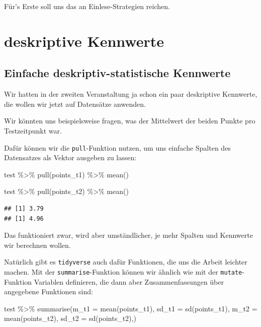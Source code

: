 \documentclass[
]{book}
\newenvironment{Shaded}{\begin{snugshade}}{\end{snugshade}}
\newcommand{\AttributeTok}[1]{\textcolor[rgb]{0.77,0.63,0.00}{#1}}
\newcommand{\FunctionTok}[1]{\textcolor[rgb]{0.00,0.00,0.00}{#1}}
\newcommand{\NormalTok}[1]{#1}
\newcommand{\SpecialCharTok}[1]{\textcolor[rgb]{0.00,0.00,0.00}{#1}}
\begin{document}
Für's Erste soll uns das an Einlese-Strategien reichen.

\hypertarget{deskriptive-kennwerte}{%
\section{deskriptive Kennwerte}\label{deskriptive-kennwerte}}

\hypertarget{einfache-deskriptiv-statistische-kennwerte-1}{%
\subsection{Einfache deskriptiv-statistische Kennwerte}\label{einfache-deskriptiv-statistische-kennwerte-1}}

Wir hatten in der zweiten Veranstaltung ja schon ein paar deskriptive Kennwerte, die wollen wir jetzt auf Datensätze anwenden.

Wir könnten uns beispielsweise fragen, was der Mittelwert der beiden Punkte pro Testzeitpunkt war.

Dafür können wir die \texttt{pull}-Funktion nutzen, um uns einfache Spalten des Datensatzes als Vektor ausgeben zu lassen:

\begin{Shaded}
\begin{Highlighting}[]
\NormalTok{test }\SpecialCharTok{\%\textgreater{}\%} 
  \FunctionTok{pull}\NormalTok{(points\_t1) }\SpecialCharTok{\%\textgreater{}\%} 
  \FunctionTok{mean}\NormalTok{()}

\NormalTok{test }\SpecialCharTok{\%\textgreater{}\%} 
  \FunctionTok{pull}\NormalTok{(points\_t2) }\SpecialCharTok{\%\textgreater{}\%} 
  \FunctionTok{mean}\NormalTok{()}
\end{Highlighting}
\end{Shaded}

\begin{verbatim}
## [1] 3.79
## [1] 4.96
\end{verbatim}

Das funktioniert zwar, wird aber umständlicher, je mehr Spalten und Kennwerte wir berechnen wollen.

Natürlich gibt es \texttt{tidyverse} auch dafür Funktionen, die uns die Arbeit leichter machen. Mit der \texttt{summarise}-Funktion können wir ähnlich wie mit der \texttt{mutate}-Funktion Variablen definieren, die dann aber Zusammenfassungen über angegebene Funktionen sind:

\begin{Shaded}
\begin{Highlighting}[]
\NormalTok{test }\SpecialCharTok{\%\textgreater{}\%}
  \FunctionTok{summarise}\NormalTok{(}\AttributeTok{m\_t1 =} \FunctionTok{mean}\NormalTok{(points\_t1),}
            \AttributeTok{sd\_t1 =} \FunctionTok{sd}\NormalTok{(points\_t1),}
            \AttributeTok{m\_t2 =} \FunctionTok{mean}\NormalTok{(points\_t2),}
            \AttributeTok{sd\_t2 =} \FunctionTok{sd}\NormalTok{(points\_t2),)}
\end{Highlighting}
\end{Shaded}
\end{document}
